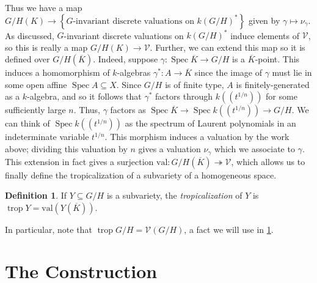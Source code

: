 \documentclass[12pt,twoside,cd]{amsart}
\theoremstyle{definition}
\newtheorem{definition}[theorem]{Definition}
\begin{document}
Thus we have a map $G/H(K) \rightarrow {\left\lbrace {G\text{-invariant discrete valuations on } k(G/H)^\ast} \right\rbrace}$ given by $\gamma \mapsto \nu_\gamma$.
As discussed, $G$-invariant discrete valuations on $k(G/H)^\ast$ induce elements of $\mathcal{V}$, so this is really a map $G/H(K) \rightarrow \mathcal{V}$.
Further, we can extend this map so it is defined over $G/H(\overline{K})$.
Indeed, suppose $\gamma: {\operatorname{Spec}}{\overline{K}} \rightarrow G/H$ is a $\overline{K}$-point.
This induces a homomorphism of $k$-algebras $\gamma^\ast: A \rightarrow \overline{K}$ since the image of $\gamma$ must lie in some open affine ${\operatorname{Spec}}{A} \subseteq X$.
Since $G/H$ is of finite type, $A$ is finitely-generated as a $k$-algebra, and so it follows that $\gamma^\ast$ factors through $k((t^{1/n}))$ for some sufficiently large $n$.
Thus, $\gamma$ factors as ${\operatorname{Spec}}{\overline{K}} \rightarrow {\operatorname{Spec}}{k((t^{1/n}))} \rightarrow G/H$.
We can think of ${\operatorname{Spec}}{k((t^{1/n}))}$ as the spectrum of Laurent polynomials in an indeterminate variable $t^{1/n}$.
This morphism induces a valuation by the work above; dividing this valuation by $n$ gives a valuation $\nu_\gamma$ which we associate to $\gamma$.
This extension in fact gives a surjection $\text{val}: G/H(\overline{K}) \twoheadrightarrow \mathcal{V}$, which allows us to finally define the tropicalization of a subvariety of a homogeneous space.
\begin{definition}
If $Y \subseteq G/H$ is a subvariety, the \emph{tropicalization} of $Y$ is ${\operatorname{trop}}{Y} = \text{val}(Y(\overline{K}))$.
\end{definition}

In particular, note that ${\operatorname{trop}}{G/H} = \mathcal{V}(G/H)$, a fact we will use in \textsection \ref{construction}.

\section{The Construction}\label{construction}
\end{document}
